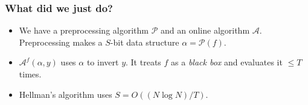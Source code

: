 \documentclass[usenames, dvipsnames, t, table]{beamer}
\newcommand{\A}{\mathcal{A}}
\renewcommand{\P}{\mathcal{P}}
\begin{document}
 \begin{frame}[fragile]
   \frametitle{What did we just do?}
   \begin{itemize}
   \item We have a preprocessing algorithm $\P$ and an online algorithm $\A$. Preprocessing makes a $S$-bit data structure $\alpha = \P(f)$.
     \pause
   \item $\A^f(\alpha, y)$ uses $\alpha$ to invert $y$. It treats $f$ as a \emph{black box} and evaluates it $\leq T$ times.
     \pause
\item Hellman's algorithm uses $S = O((N \log N) / T).$

\end{itemize}
\end{frame}
\end{document}
